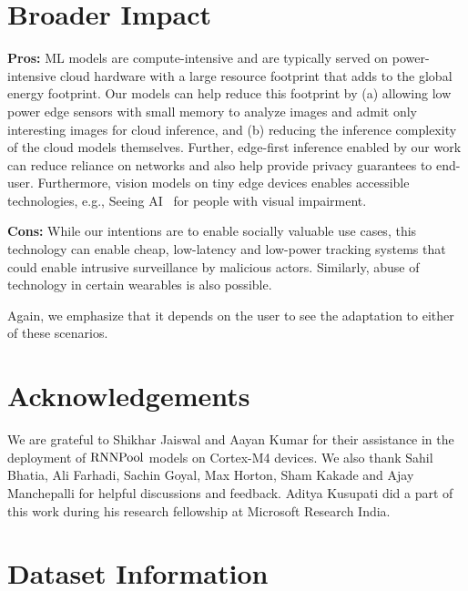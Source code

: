 \documentclass[10pt]{article}
\newcommand{\rpool}{\ensuremath{{\rm RNNPool}}\xspace}
\begin{document}
 \section*{Broader Impact}
\label{sec:broad}

\textbf{Pros:} ML models are compute-intensive and are
typically served on power-intensive cloud hardware with a large
resource footprint that adds to the global energy footprint.  Our models
can help reduce this footprint by (a) allowing low power edge sensors
with small memory to analyze images and admit only interesting images
for cloud inference, and (b) reducing the inference complexity of
the cloud models themselves.  Further, edge-first inference enabled by our
work can reduce reliance on networks and also help provide privacy
guarantees to end-user.  Furthermore, vision models on tiny edge
devices enables accessible technologies, e.g., Seeing AI~\citep{seeingai} for
people with visual impairment.

\textbf{Cons:} While our intentions are to enable socially valuable
use cases, this technology can enable cheap, low-latency and low-power
tracking systems that  could enable
intrusive surveillance by malicious actors. Similarly, abuse
of technology in certain wearables is also possible. 

Again, we emphasize that it depends on the user to see the adaptation to either of these scenarios.
 \section*{Acknowledgements}
We are grateful to Shikhar Jaiswal and Aayan Kumar for their
assistance in the deployment of \rpool models on Cortex-M4 devices. We
also thank Sahil Bhatia, Ali Farhadi, Sachin Goyal, Max Horton, Sham
Kakade and Ajay Manchepalli for helpful discussions and
feedback. Aditya Kusupati did a part of this work during his research
fellowship at Microsoft Research India.
 
\clearpage
\appendix
\section{Dataset Information}
\label{sec:datasets}
\end{document}
